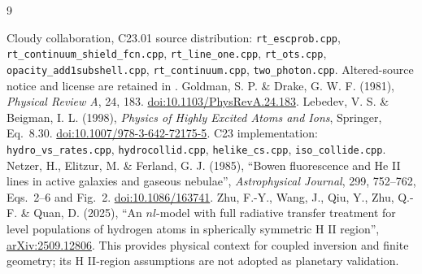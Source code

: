\documentclass[10pt,a4paper]{article}
\begin{document}
\begin{thebibliography}{9}
\raggedright
{} Cloudy collaboration, C23.01 source distribution:
\texttt{rt\_escprob.cpp}, \texttt{rt\_continuum\_shield\_fcn.cpp},
\texttt{rt\_line\_one.cpp}, \texttt{rt\_ots.cpp},
\texttt{opacity\_add1subshell.cpp}, \texttt{rt\_continuum.cpp},
\texttt{two\_photon.cpp}. Altered-source notice and license are retained in
.
 Goldman, S. P. \& Drake, G. W. F. (1981),
\emph{Physical Review A}, 24, 183.
\href{https://doi.org/10.1103/PhysRevA.24.183}{doi:10.1103/PhysRevA.24.183}.
 Lebedev, V. S. \& Beigman, I. L. (1998),
\emph{Physics of Highly Excited Atoms and Ions}, Springer, Eq.~8.30.
\href{https://doi.org/10.1007/978-3-642-72175-5}{doi:10.1007/978-3-642-72175-5}.
C23 implementation: \texttt{hydro\_vs\_rates.cpp}, \texttt{hydrocollid.cpp},
\texttt{helike\_cs.cpp}, \texttt{iso\_collide.cpp}.
 Netzer, H., Elitzur, M. \& Ferland, G. J. (1985),
``Bowen fluorescence and He II lines in active galaxies and gaseous nebulae'',
\emph{Astrophysical Journal}, 299, 752--762, Eqs.~2--6 and Fig.~2.
\href{https://doi.org/10.1086/163741}{doi:10.1086/163741}.
 Zhu, F.-Y., Wang, J., Qiu, Y., Zhu, Q.-F. \& Quan, D. (2025),
``An $nl$-model with full radiative transfer treatment for level populations
of hydrogen atoms in spherically symmetric H II region'',
\href{https://arxiv.org/abs/2509.12806}{arXiv:2509.12806}.
This provides physical context for coupled inversion and finite geometry;
its H II-region assumptions are not adopted as planetary validation.
\end{thebibliography}
\end{document}
